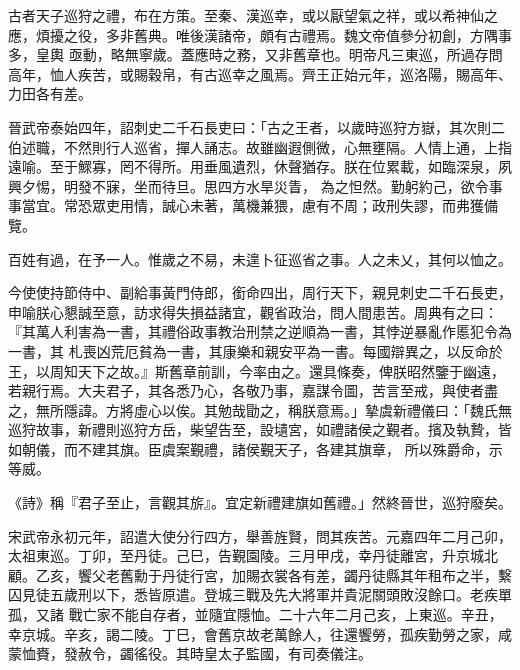 
\begin{pinyinscope}

 古者天子巡狩之禮，布在方策。至秦、漢巡幸，或以厭望氣之祥，或以希神仙之應，煩擾之役，多非舊典。唯後漢諸帝，頗有古禮焉。魏文帝值參分初創，方隅事多，皇輿
 亟動，略無寧歲。蓋應時之務，又非舊章也。明帝凡三東巡，所過存問高年，恤人疾苦，或賜穀帛，有古巡幸之風焉。齊王正始元年，巡洛陽，賜高年、力田各有差。



 晉武帝泰始四年，詔刺史二千石長吏曰：「古之王者，以歲時巡狩方嶽，其次則二伯述職，不然則行人巡省，撣人誦志。故雖幽遐側微，心無壅隔。人情上通，上指遠喻。至于鰥寡，罔不得所。用垂風遺烈，休聲猶存。朕在位累載，如臨深泉，夙興夕惕，明發不寐，坐而待旦。思四方水旱災眚，
 為之怛然。勤躬約己，欲令事事當宜。常恐眾吏用情，誠心未著，萬機兼猥，慮有不周；政刑失謬，而弗獲備覽。



 百姓有過，在予一人。惟歲之不易，未遑卜征巡省之事。人之未乂，其何以恤之。



 今使使持節侍中、副給事黃門侍郎，銜命四出，周行天下，親見刺史二千石長吏，申喻朕心懇誠至意，訪求得失損益諸宜，觀省政治，問人間患苦。周典有之曰：『其萬人利害為一書，其禮俗政事教治刑禁之逆順為一書，其悖逆暴亂作慝犯令為一書，其
 札喪凶荒厄貧為一書，其康樂和親安平為一書。每國辯異之，以反命於王，以周知天下之故。』斯舊章前訓，今率由之。還具條奏，俾朕昭然鑒于幽遠，若親行焉。大夫君子，其各悉乃心，各敬乃事，嘉謀令圖，苦言至戒，與使者盡之，無所隱諱。方將虛心以俟。其勉哉勖之，稱朕意焉。」摯虞新禮儀曰：「魏氏無巡狩故事，新禮則巡狩方岳，柴望告至，設壝宮，如禮諸侯之覲者。擯及執贄，皆如朝儀，而不建其旗。臣虞案覲禮，諸侯覲天子，各建其旗章，
 所以殊爵命，示等威。



 《詩》稱『君子至止，言觀其旂』。宜定新禮建旗如舊禮。」然終晉世，巡狩廢矣。



 宋武帝永初元年，詔遣大使分行四方，舉善旌賢，問其疾苦。元嘉四年二月己卯，太祖東巡。丁卯，至丹徒。己巳，告覲園陵。三月甲戌，幸丹徒離宮，升京城北顧。乙亥，饗父老舊勳于丹徒行宮，加賜衣裳各有差，蠲丹徒縣其年租布之半，繫囚見徒五歲刑以下，悉皆原遣。登城三戰及先大將軍并貴泥關頭敗沒餘口。老疾單孤，又諸
 戰亡家不能自存者，並隨宜隱恤。二十六年二月己亥，上東巡。辛丑，幸京城。辛亥，謁二陵。丁巳，會舊京故老萬餘人，往還饗勞，孤疾勤勞之家，咸蒙恤賚，發赦令，蠲徭役。其時皇太子監國，有司奏儀注。




\end{pinyinscope}
